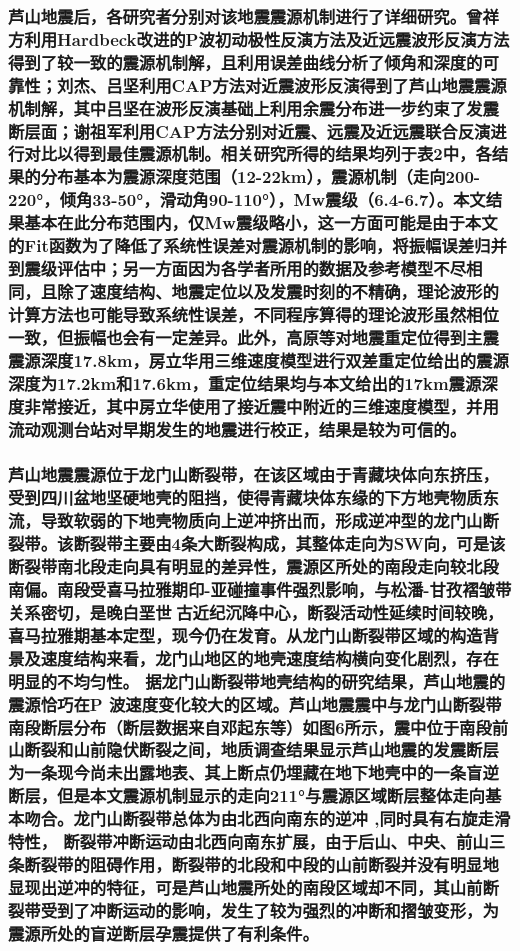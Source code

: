 \documentclass[a4paper,12pt,single,pdftex]{scrartcl}
\begin{document}
\label{ID_1559489052}\subsubsection{芦山地震后，各研究者分别对该地震震源机制进行了详细研究。曾祥方\cite{曾祥方2013}利用Hardbeck\cite{Hardebeck2002}改进的P波初动极性反演方法及近远震波形反演方法得到了较一致的震源机制解，且利用误差曲线分析了倾角和深度的可靠性；刘杰\cite{刘杰2013}、吕坚\cite{吕坚2013}利用CAP方法对近震波形反演得到了芦山地震震源机制解，其中吕坚在波形反演基础上利用余震分布进一步约束了发震断层面；谢祖军\cite{谢祖军2013}利用CAP方法分别对近震、远震及近远震联合反演进行对比以得到最佳震源机制。相关研究所得的结果均列于表2中，各结果的分布基本为震源深度范围（12-22km），震源机制（走向200-220°，倾角33-50°，滑动角90-110°），Mw震级（6.4-6.7）。本文结果基本在此分布范围内，仅Mw震级略小，这一方面可能是由于本文的Fit函数为了降低了系统性误差对震源机制的影响，将振幅误差归并到震级评估中；另一方面因为各学者所用的数据及参考模型不尽相同，且除了速度结构、地震定位以及发震时刻的不精确，理论波形的计算方法也可能导致系统性误差，不同程序算得的理论波形虽然相位一致，但振幅也会有一定差异\cite{Herrmann1985}。此外，高原等\cite{高原2013}对地震重定位得到主震震源深度17.8km，房立华\cite{房立华2013}用三维速度模型进行双差重定位给出的震源深度为17.2km和17.6km，重定位结果均与本文给出的17km震源深度非常接近，其中房立华使用了接近震中附近的三维速度模型，并用流动观测台站对早期发生的地震进行校正，结果是较为可信的。}

\label{ID_411413530}\subsubsection{芦山地震震源位于龙门山断裂带，在该区域由于青藏块体向东挤压，受到四川盆地坚硬地壳的阻挡，使得青藏块体东缘的下方地壳物质东流，导致软弱的下地壳物质向上逆冲挤出而，形成逆冲型的龙门山断裂带\cite{Zhang2013}。该断裂带主要由4条大断裂构成\cite{邓起东1994,李智武2008}，其整体走向为SW向，可是该断裂带南北段走向具有明显的差异性\cite{郭正吾1996,Jia2006,Arne1997,邓康龄2007}，震源区所处的南段走向较北段南偏。南段受喜马拉雅期印-亚碰撞事件强烈影响，与松潘-甘孜褶皱带关系密切，是晚白垩世古近纪沉降中心，断裂活动性延续时间较晚，喜马拉雅期基本定型，现今仍在发育\cite{李智武2008}。从龙门山断裂带区域的构造背景及速度结构来看，龙门山地区的地壳速度结构横向变化剧烈，存在明显的不均匀性\cite{Zhang2013,Wang2010,张忠杰2009,雷建设2009,Zhang2011}。 据龙门山断裂带地壳结构的研究结果\cite{雷建设2009}，芦山地震的震源恰巧在P 波速度变化较大的区域。芦山地震震中与龙门山断裂带南段断层分布（断层数据来自邓起东等\cite{邓起东2002}）如图6所示，震中位于南段前山断裂和山前隐伏断裂之间，地质调查结果\cite{徐锡伟2013,徐锡伟2013a}显示芦山地震的发震断层为一条现今尚未出露地表、其上断点仍埋藏在地下地壳中的一条盲逆断层，但是本文震源机制显示的走向211°与震源区域断层整体走向基本吻合。龙门山断裂带总体为由北西向南东的逆冲 ,同时具有右旋走滑特性\cite{唐荣昌1991,李勇2006,Densmore2007,陈国光2007}， 断裂带冲断运动由北西向南东扩展，由于后山、中央、前山三条断裂带的阻碍作用，断裂带的北段和中段的山前断裂并没有明显地显现出逆冲的特征，可是芦山地震所处的南段区域却不同，其山前断裂带受到了冲断运动的影响，发生了较为强烈的冲断和摺皱变形，为震源所处的盲逆断层孕震提供了有利条件。}
\end{document}
